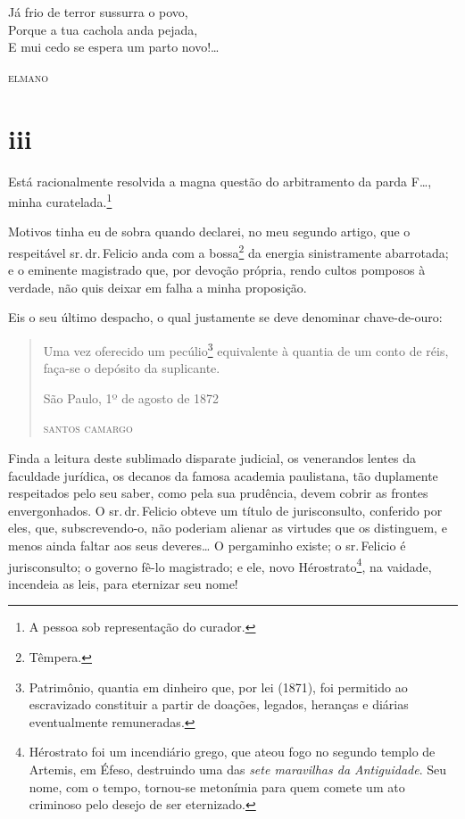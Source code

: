 \epigraph{Já frio de terror sussurra o povo,\\
Porque a tua cachola anda pejada,\footnotemark\\
E mui cedo se espera um parto novo!\ldots{}}{\textsc{elmano}\footnotemark}



\section{iii}

Está racionalmente resolvida a magna questão do arbitramento da parda
F\ldots{}, minha curatelada.\footnote{ A pessoa sob representação do
  curador.}

Motivos tinha eu de sobra quando declarei, no meu segundo artigo, que o
respeitável sr.\,dr.\,Felicio anda com a bossa\footnote{ Têmpera.} da
energia sinistramente abarrotada; e o eminente magistrado que, por
devoção própria, rendo cultos pomposos à verdade, não quis deixar em
falha a minha proposição.

Eis o seu último despacho, o qual justamente se deve denominar
chave-de-ouro:

\begin{quote}
Uma vez oferecido um pecúlio\footnote{ Patrimônio, quantia em dinheiro
  que, por lei (1871), foi permitido ao escravizado constituir a partir
  de doações, legados, heranças e diárias eventualmente remuneradas.}
equivalente à quantia de um conto de réis, faça-se o depósito da
suplicante.

\begin{flushright}
São Paulo, 1º de agosto de 1872

\textsc{santos camargo}
\end{flushright}
\end{quote}

Finda a leitura deste sublimado disparate judicial, os venerandos lentes
da faculdade jurídica, os decanos da famosa academia paulistana, tão
duplamente respeitados pelo seu saber, como pela sua prudência, devem
cobrir as frontes envergonhados. O sr.\,dr.\,Felicio obteve um título de
jurisconsulto, conferido por eles, que, subscrevendo-o, não poderiam
alienar as virtudes que os distinguem, e menos ainda faltar aos seus
deveres\ldots{} O pergaminho existe; o sr.\,Felicio é jurisconsulto; o governo
fê-lo magistrado; e ele, novo Hérostrato\footnote{ Hérostrato foi um
  incendiário grego, que ateou fogo no segundo templo de Artemis, em
  Éfeso, destruindo uma das \emph{sete maravilhas da Antiguidade}. Seu
  nome, com o tempo, tornou-se metonímia para quem comete um ato
  criminoso pelo desejo de ser eternizado.}, na vaidade, incendeia as
leis, para eternizar seu nome!

